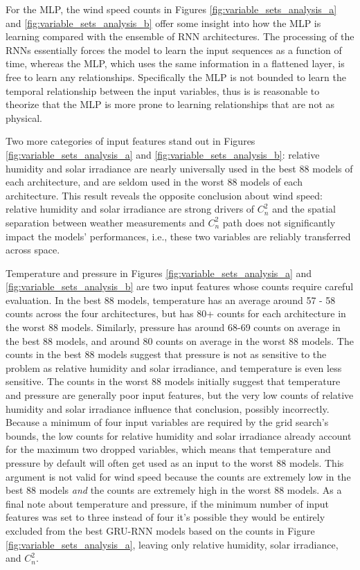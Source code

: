 For the \ac{MLP}, the wind speed counts in Figures \ref{fig:variable_sets_analysis_a} and \ref{fig:variable_sets_analysis_b} offer some insight into how the \ac{MLP} is learning compared with the ensemble of \ac{RNN} architectures. The processing of the \ac{RNN}s essentially forces the model to learn the input sequences as a function of time, whereas the \ac{MLP}, which uses the same information in a flattened layer, is free to learn any relationships. Specifically the \ac{MLP} is not bounded to learn the temporal relationship between the input variables, thus is is reasonable to theorize that the \ac{MLP} is more prone to learning relationships that are not as physical.

Two more categories of input features stand out in Figures \ref{fig:variable_sets_analysis_a} and \ref{fig:variable_sets_analysis_b}: relative humidity and solar irradiance are nearly universally used in the best 88 models of each architecture, and are seldom used in the worst 88 models of each architecture. This result reveals the opposite conclusion about wind speed: relative humidity and solar irradiance are strong drivers of $C_{n}^{2}$ and the spatial separation between weather measurements and $C_{n}^{2}$ path does not significantly impact the models' performances, i.e., these two variables are reliably transferred across space.

Temperature and pressure in Figures \ref{fig:variable_sets_analysis_a} and \ref{fig:variable_sets_analysis_b} are two input features whose counts require careful evaluation. In the best 88 models, temperature has an average around 57 - 58 counts across the four architectures, but has 80+ counts for each architecture in the worst 88 models. Similarly, pressure has around 68-69 counts on average in the best 88 models, and around 80 counts on average in the worst 88 models. The counts in the best 88 models suggest that pressure is not as sensitive to the problem as relative humidity and solar irradiance, and temperature is even less sensitive. The counts in the worst 88 models initially suggest that temperature and pressure are generally poor input features, but the very low counts of relative humidity and solar irradiance influence that conclusion, possibly incorrectly. Because a minimum of four input variables are required by the grid search's bounds, the low counts for relative humidity and solar irradiance already account for the maximum two dropped variables, which means that temperature and pressure by default will often get used as an input to the worst 88 models. This argument is not valid for wind speed because the counts are extremely low in the best 88 models \emph{and} the counts are extremely high in the worst 88 models. As a final note about temperature and pressure, if the minimum number of input features was set to three instead of four it's possible they would be entirely excluded from the best \ac{GRU-RNN} models based on the counts in Figure \ref{fig:variable_sets_analysis_a}, leaving only relative humidity, solar irradiance, and $C_{n}^{2}$. 

